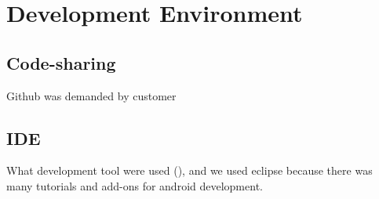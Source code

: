 \chapter{Development Environment}
\section{Code-sharing}
Github was demanded by customer
\section{IDE}
What development tool were used (), and we used eclipse because there was many tutorials and add-ons for android development.